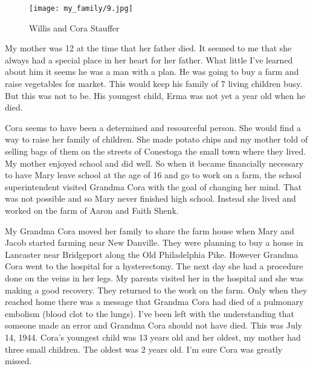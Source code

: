\begin{figure}
\centering
\texttt{[image: my\_family/9.jpg]}
\caption{Willis and Cora Stauffer}
\label{willis-cora-stauffer}
\end{figure}

My mother was 12 at the time that her father died. 
It seemed to me that she always had a special place in her heart for her father. 
What little I've learned about him it seems he was a man with a plan.
He was going to buy a farm and raise vegetables for market.
This would keep his family of 7 living children busy.
But this was not to be. His youngest child, Erma was not yet a year old when he died. 

Cora seems to have been a determined and resourceful person. She would find a way to raise her family of children. She made potato chips and my mother told of selling bags of them on the streets of Conestoga the small town where they lived.
My mother enjoyed school and did well. 
So when it became financially necessary to have Mary leave school at the age of 16 and go to work on a farm, the school superintendent visited Grandma Cora with the goal of changing her mind. 
That was not possible and so Mary never finished high school. 
Instead she lived and worked on the farm of Aaron and Faith Shenk.

My Grandma Cora moved her family to share the farm house when Mary and Jacob started farming near New Danville.
They were planning to buy a house in Lancaster near Bridgeport along the Old Philadelphia Pike.
However Grandma Cora went to the hospital for a hysterectomy.
The next day she had a procedure done on the veins in her legs.
My parents visited her in the hospital and she was making a good recovery.
They returned to the work on the farm.
Only when they reached home there was a message that Grandma Cora had died of a pulmonary embolism (blood clot to the lungs).
I've been left with the understanding that someone made an error and Grandma Cora should not have died.
This was July 14, 1944.
Cora's youngest child was 13 years old and her oldest, my mother had three small children. 
The oldest was 2 years old. 
I'm sure Cora was greatly missed.

